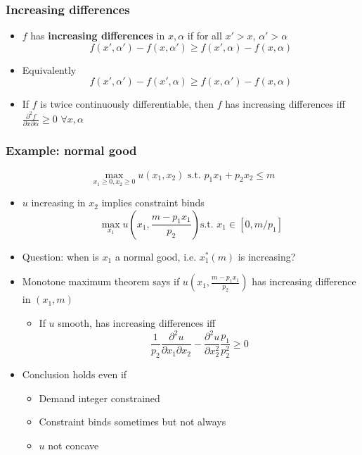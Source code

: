 \begin{frame}\frametitle{Increasing differences}
  \begin{itemize}
  \item $f$ has \textbf{increasing differences} in $x,\alpha$
    if for all $x'>x$, $\alpha'>\alpha$ 
    \[ f(x',\alpha') - f(x,\alpha') \geq f(x',\alpha) - f(x,\alpha) \]
  \item Equivalently
    \[ f(x',\alpha') - f(x',\alpha) \geq f(x,\alpha') - f(x,\alpha) \]
  \item If $f$ is twice continuously differentiable, then $f$ has
    increasing differences iff $\frac{\partial^2 f}{\partial
      x \partial \alpha} \geq 0$ $\forall x, \alpha$
  \end{itemize}
\end{frame}

\begin{frame}\frametitle{Example: normal good}
  \[ \max_{x_1\geq 0, x_2\geq 0} u(x_1,x_2) \text{ s.t. } p_1 x_1 + p_2 x_2 \leq m \]
  \begin{itemize}
  \item $u$ increasing in $x_2$ implies constraint binds
    \[ \max_{x_1} u\left(x_1,\frac{m-p_1 x_1}{p_2} \right) \text{
      s.t. } x_1 \in [0, m/p_1] \]
  \item Question: when is $x_1$ a normal good, i.e. $x_1^*(m)$ is
    increasing?
  \item Monotone maximum theorem says if $u\left(x_1,\frac{m-p_1
        x_1}{p_2} \right)$ has increasing difference in $(x_1, m)$
    \begin{itemize}
    \item If $u$ smooth, has increasing differences iff
      \[ \frac{1}{p_2}\frac{\partial^2 u}{\partial x_1 \partial x_2}
      - \frac{\partial^2 u}{\partial x_2^2} \frac{p_1}{p_2^2} \geq
      0 \] 
    \end{itemize}
  \item Conclusion holds even if 
    \begin{itemize}
    \item Demand integer constrained
    \item Constraint binds sometimes but not always
    \item $u$ not concave
    \end{itemize}
  \end{itemize}
\end{frame}




